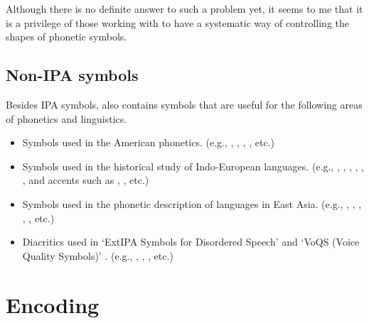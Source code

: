 Although there is no definite answer to such a problem yet, it seems
to me that it is a privilege of those working with \MF{} to have a
systematic way of controlling the shapes of phonetic symbols.

\subsection{Non-IPA symbols}

Besides IPA symbols, \tipa{} also contains symbols that are useful for
the following areas of phonetics and linguistics.

\begin{itemize}
\itemsep0pt
\item Symbols used in the American phonetics. (e.g., \textturncelig,
  \textsce, \textscomega, \textlambda, etc.)
\item Symbols used in the historical study of Indo-European languages.
  (e.g., \textthorn, \textwynn, \texthvlig, \textcommatailz,
  \textsoftsign, \texthardsign, and accents such as ,
  , etc.)
\item Symbols used in the phonetic description of languages in East Asia.
  (e.g., \textlhtlongi, \textvibyi, \textctd, \textctn, \textctt, etc.)
\item Diacritics used in `ExtIPA Symbols for Disordered
  Speech' \citep{extIPA} and `VoQS (Voice Quality Symbols)' \citep{VoQS}.
  (e.g., , , , etc.)
\end{itemize}


\section{Encoding}

